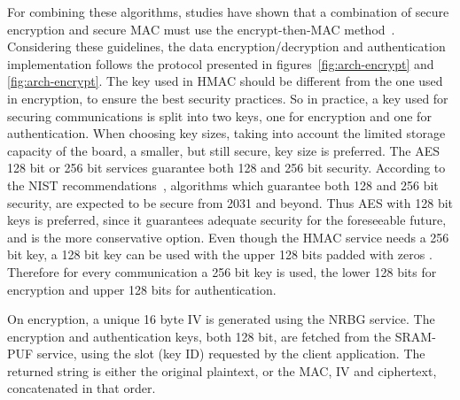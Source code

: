 For combining these algorithms, studies have shown that a combination of secure encryption and secure \ac{MAC} must use the encrypt-then-MAC method~\cite{encryptmacorder}.
Considering these guidelines, the data encryption/decryption and authentication implementation follows the protocol presented in figures~\ref{fig:arch-encrypt} and \ref{fig:arch-encrypt}.
The key used in HMAC should be different from the one used in encryption, to ensure the best security practices. So in practice, a key used for securing communications is split into two keys, one for encryption and one for authentication.
When choosing key sizes, taking into account the limited storage capacity of the board, a smaller, but still secure, key size is preferred. The \ac{AES} 128 bit or 256 bit services guarantee both 128 and 256 bit security. According to the \ac{NIST} recommendations~\cite{nistRecommendations}, algorithms which guarantee both 128 and 256 bit security, are expected to be secure from 2031 and beyond. Thus \ac{AES} with 128 bit keys is preferred, since it guarantees adequate security for the foreseeable future, and is the more conservative option.
Even though the HMAC service needs a 256 bit key, a 128 bit key can be used with the upper 128 bits padded with zeros \cite{smartfusionSecurityPractices}.
Therefore for every communication a 256 bit key is used, the lower 128 bits for encryption and upper 128 bits for authentication.

On encryption, a unique 16 byte \ac{IV} is generated using the \ac{NRBG} service.
The encryption and authentication keys, both 128 bit, are fetched from the SRAM-PUF service, using the slot (key ID) requested by the client application.
The returned string is either the original plaintext, or the \ac{MAC}, \ac{IV} and ciphertext, concatenated in that order.




